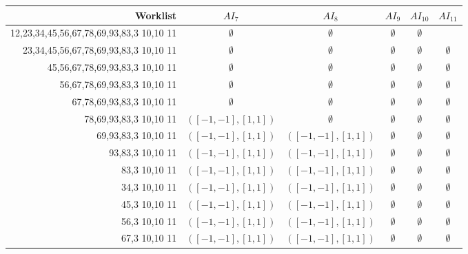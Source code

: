 \documentclass[fleqn,12pt]{article}
\begin{document}
\begin{sidewaystable}
\begin{tabular}{r|c|c|c|c|c|c}
\end{tabular}

\begin{tabular}{r|c|c|c|c|c}
Worklist & $AI_7$ & $AI_8$ & $AI_9$ & $AI_{10}$ & $AI_{11}$\\
\hline
12,23,34,45,56,67,78,69,93,83,3 10,10 11 & $\emptyset$ & $\emptyset$ & $\emptyset$ & $\emptyset$\\

23,34,45,56,67,78,69,93,83,3 10,10 11  & $\emptyset$ & $\emptyset$ & $\emptyset$ & $\emptyset$ & $\emptyset$\\

45,56,67,78,69,93,83,3 10,10 11 & $\emptyset$ & $\emptyset$ & $\emptyset$ & $\emptyset$ & $\emptyset$\\

56,67,78,69,93,83,3 10,10 11 & $\emptyset$ & $\emptyset$ & $\emptyset$ & $\emptyset$ & $\emptyset$\\

67,78,69,93,83,3 10,10 11 &  $\emptyset$ & $\emptyset$ & $\emptyset$ & $\emptyset$ & $\emptyset$\\

78,69,93,83,3 10,10 11 & $([-1,-1],[1,1])$ & $\emptyset$ & $\emptyset$ & $\emptyset$ & $\emptyset$\\

69,93,83,3 10,10 11 & $([-1,-1],[1,1])$ & $([-1,-1],[1,1])$ & $\emptyset$ & $\emptyset$ & $\emptyset$\\

93,83,3 10,10 11 & $([-1,-1],[1,1])$ & $([-1,-1],[1,1])$ & $\emptyset$ & $\emptyset$ & $\emptyset$\\

83,3 10,10 11 & $([-1,-1],[1,1])$ & $([-1,-1],[1,1])$ & $\emptyset$ & $\emptyset$ & $\emptyset$\\

34,3 10,10 11 &  $([-1,-1],[1,1])$ & $([-1,-1],[1,1])$ & $\emptyset$ & $\emptyset$ & $\emptyset$\\

45,3 10,10 11 &  $([-1,-1],[1,1])$ & $([-1,-1],[1,1])$ & $\emptyset$ & $\emptyset$ & $\emptyset$\\

56,3 10,10 11& $([-1,-1],[1,1])$ & $([-1,-1],[1,1])$ & $\emptyset$ & $\emptyset$ & $\emptyset$\\

67,3 10,10 11 & $([-1,-1],[1,1])$ & $([-1,-1],[1,1])$ & $\emptyset$ & $\emptyset$ & $\emptyset$\\


\end{tabular}
\end{sidewaystable}
\end{document}
